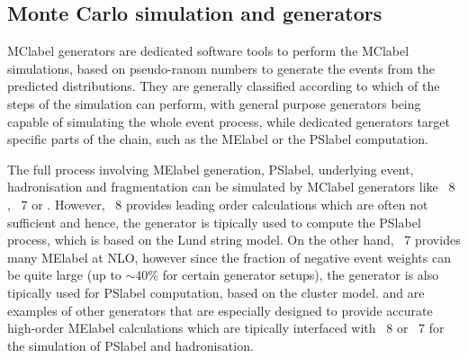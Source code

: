 \subsection{Monte Carlo simulation and generators}

\acrshort{MClabel} generators are dedicated software tools to perform the \acrshort{MClabel} simulations, based on pseudo-ranom numbers to generate the events from the predicted distributions. They are generally classified according to which of the steps of the simulation can perform, with general purpose generators being capable of simulating the whole event process, while dedicated generators target specific parts of the chain, such as the \acrshort{MElabel} or the \acrshort{PSlabel} computation.

The full process involving \acrshort{MElabel} generation, \acrshort{PSlabel}, underlying event, hadronisation and fragmentation can be simulated by \acrshort{MClabel} generators like \PYTHIA~8 %
, \HERWIG~7 %
or \SHERPA %
. However, \PYTHIA~8 provides leading order calculations which are often not
sufficient and hence, the generator is tipically used to compute the \acrshort{PSlabel} process, which is based on the Lund string model. On the other hand, \HERWIG~7 provides many \acrshort{MElabel} at NLO, however since the fraction of negative event weights can be quite large (up to $\sim40\%$ for certain generator setups), the generator is also tipically used for \acrshort{PSlabel} computation, based on the cluster model. \POWHEGBOX %
and \MGMCatNLO %
are examples of other generators that are especially designed to provide accurate high-order \acrshort{MElabel} calculations which are tipically interfaced with \PYTHIA~8 or \HERWIG~7 for the simulation of \acrshort{PSlabel} and hadronisation. 

